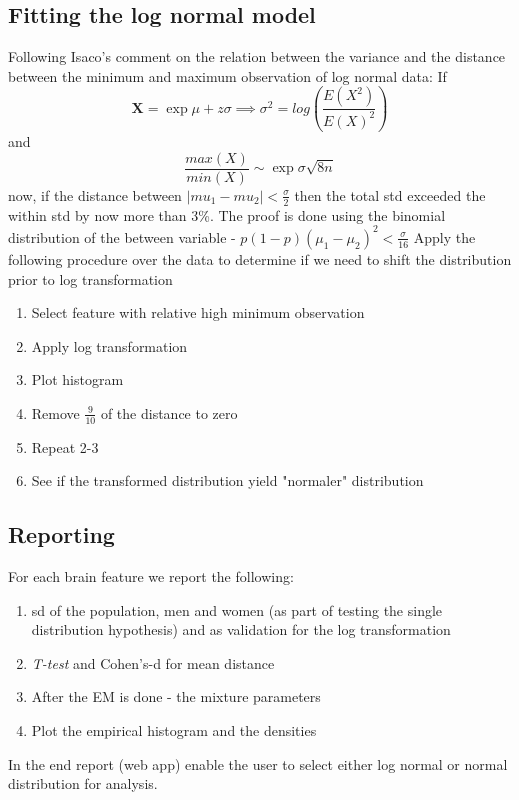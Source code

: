 \documentclass[12pt]{article}
\begin{document}
\subsection*{Fitting the log normal model}
Following Isaco's comment on the relation between the variance and the distance between the minimum and maximum observation of log normal data:
If 
\[
\mathbf{X} = \exp{\mu + z \sigma} \implies \sigma^2 = log(\dfrac{E(X^2)}{E(X)^2})
\]
and
\[
\frac{max(X)}{min(X)} \sim \exp{\sigma \sqrt{8n}}
\]
now, if the distance between $|mu_1 - mu_2| < \frac{\sigma}{2}$ then the total std exceeded the within std by now more than 3\%. The proof is done using the binomial distribution of the between variable - $p(1-p)(\mu_1 - \mu_2)^2 < \frac{\sigma}{16}$
Apply the following procedure over the data to determine if we need to shift the distribution prior to log transformation
	\begin{enumerate}
		\item Select feature with relative high minimum observation
		\item Apply log transformation
		\item Plot histogram
		\item Remove $\frac{9}{10}$ of the distance to zero
		\item Repeat 2-3
		\item See if the transformed distribution yield "normaler" distribution
	\end{enumerate}


\subsection*{Reporting}
For each brain feature we report the following:
	\begin{enumerate}
		\item sd of the population, men and women (as part of testing the single distribution hypothesis) and as validation for the log transformation
		\item \textit{T-test} and Cohen's-d for mean distance
		\item After the EM is done - the mixture parameters
		\item Plot the empirical histogram and the densities 
	\end{enumerate}
In the end report (web app) enable the user to select either log normal or normal distribution for analysis.
\end{document}
